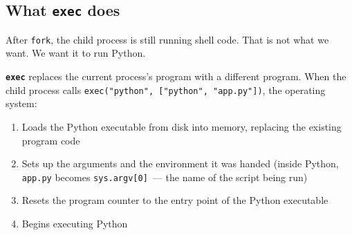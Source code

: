 \begin{codebox}[short]

\begin{Shaded}
\begin{Highlighting}[]

\OperatorTok{=}

\OperatorTok{==} \NormalTok{:}
    \NormalTok{(}\NormalTok{, [}\NormalTok{, }\NormalTok{])}
\NormalTok{:}
\end{Highlighting}
\end{Shaded}

\end{codebox}

\subsection*{\texorpdfstring{What \texttt{exec} does}{What exec does}}\label{01-command-to-process:what-exec-does}

After \texttt{fork}, the child process is still running shell code. That is not what we want. We want it to run Python.

\textbf{\texttt{exec}} replaces the current process's program with a different program. When the child process calls \texttt{exec("python",}\allowbreak{}\texttt{\ {[}"python",}\allowbreak{}\texttt{\ "app.}\allowbreak{}\texttt{py"{]})}, the operating system:

\begin{enumerate}
\def\labelenumi{\arabic{enumi}.}
\tightlist
\item
  Loads the Python executable from disk into memory, replacing the existing program code
\item
  Sets up the arguments and the environment it was handed (inside Python, \texttt{app.py} becomes \texttt{sys.argv{[}0{]}}~--- the name of the script being run)
\item
  Resets the program counter to the entry point of the Python executable
\item
  Begins executing Python
\end{enumerate}

